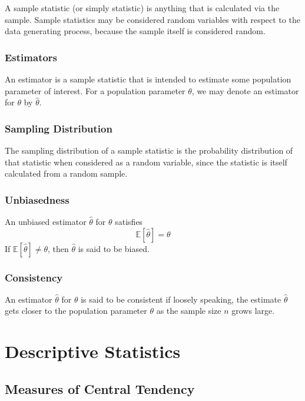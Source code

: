 \documentclass[11pt]{report} %
\begin{document}
A sample statistic (or simply statistic) is anything that is calculated via the sample. Sample statistics may be considered random variables with respect to the data generating process, because the sample itself is considered random.

\subsubsection{Estimators}

An estimator is a sample statistic that is intended to estimate some population parameter of interest. For a population parameter $\theta$, we may denote an estimator for $\theta$ by $\hat{\theta}$.

\subsubsection{Sampling Distribution}

The sampling distribution of a sample statistic is the probability distribution of that statistic when considered as a random variable, since the statistic is itself calculated from a random sample.

\subsubsection{Unbiasedness}

An unbiased estimator $\hat{\theta}$ for $\theta$ satisfies
\begin{equation}
\mathbb{E}\left[\hat{\theta}\right] = \theta
\end{equation}
If $\mathbb{E}\left[\hat{\theta}\right] \neq \theta$, then $\hat{\theta}$ is said to be biased.

\subsubsection{Consistency}

An estimator $\hat{\theta}$ for $\theta$ is said to be consistent if loosely speaking, the estimate $\hat{\theta}$ gets closer to the population parameter $\theta$ as the sample size $n$ grows large.

\section{Descriptive Statistics}

\subsection{Measures of Central Tendency}
\end{document}
